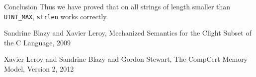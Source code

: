 \documentclass{beamer}
\begin{document}
\begin{frame}{Conclusion}
  Thus we have proved that on all strings of length smaller than
  \texttt{UINT\_MAX}, \texttt{strlen} works correctly. 
  
  \end{frame}

 

\begin{frame}
    \begin{thebibliography}{9}

    {Sandrine Blazy and Xavier Leroy},
    {Mechanized Semantics for the Clight Subset of the C Language},
    {2009}
      
    Xavier Leroy and Sandrine Blazy and Gordon Stewart,
    {The CompCert Memory Model, Version 2},
    {2012}

   

\end{thebibliography}
  
  \end{frame}
    
\end{document}
